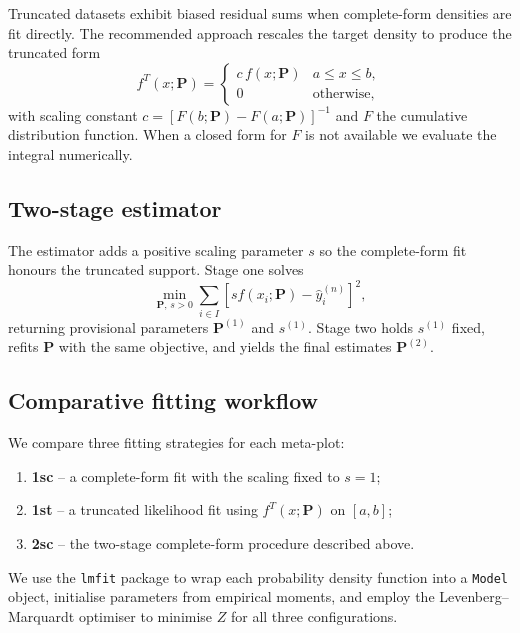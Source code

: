 \documentclass[12pt]{article}
\begin{document}
Truncated datasets exhibit biased residual sums when complete-form densities are fit directly. The recommended approach rescales the target density to produce the truncated form
\begin{equation}
  f^{T}(x; \bm{P}) =
    \begin{cases}
      c\, f(x; \bm{P}) & a \leq x \leq b, \\
      0 & \text{otherwise},
    \end{cases}
\end{equation}
with scaling constant $c = [F(b; \bm{P}) - F(a; \bm{P})]^{-1}$ and $F$ the cumulative distribution function. When a closed form for $F$ is not available we evaluate the integral numerically.

\subsection{Two-stage estimator}
\label{sec:methods_twostage}

The estimator adds a positive scaling parameter $s$ so the complete-form fit honours the truncated support. Stage one solves
\begin{equation}
  \min_{\bm{P},\, s>0} \sum_{i \in I} \left[s f(x_i; \bm{P}) - \hat{y}_i^{(n)}\right]^2,
\end{equation}
returning provisional parameters $\bm{P}^{(1)}$ and $s^{(1)}$. Stage two holds $s^{(1)}$ fixed, refits $\bm{P}$ with the same objective, and yields the final estimates $\bm{P}^{(2)}$.

\subsection{Comparative fitting workflow}
\label{sec:methods_benchmark}

We compare three fitting strategies for each meta-plot:
\begin{enumerate}
  \item \textbf{1sc} -- a complete-form fit with the scaling fixed to $s = 1$;
  \item \textbf{1st} -- a truncated likelihood fit using $f^{T}(x; \bm{P})$ on $[a, b]$;
  \item \textbf{2sc} -- the two-stage complete-form procedure described above.
\end{enumerate}
We use the \texttt{lmfit} package to wrap each probability density function into a \texttt{Model} object, initialise parameters from empirical moments, and employ the Levenberg--Marquardt optimiser to minimise $Z$ for all three configurations.
\end{document}
